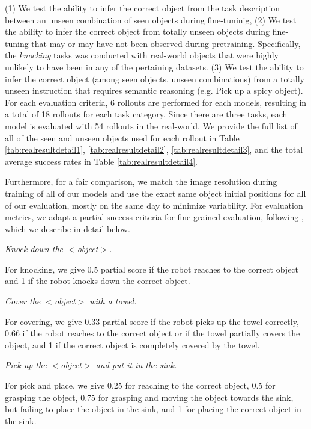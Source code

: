 \documentclass{article} %
\begin{document}
(1) We test the ability to infer the correct object from the task description between an unseen combination of seen objects during fine-tuninig, (2) We test the ability to infer the correct object from totally unseen objects during fine-tuning that may or may have not been observed during pretraining. Specifically, the \textit{knocking} tasks was conducted with real-world objects that were highly unlikely to have been in any of the pertaining datasets. (3) We test the ability to infer the correct object (among seen objects, unseen combinations) from a totally unseen instruction that requires semantic reasoning (e.g. Pick up a spicy object). For each evaluation criteria, 6 rollouts are performed for each models, resulting in a total of 18 rollouts for each task category. Since there are three tasks, each model is evaluated with 54 rollouts in the real-world. We provide the full list of all of the seen and unseen objects used for each rollout in Table \ref{tab:realresultdetail1}, \ref{tab:realresultdetail2}, \ref{tab:realresultdetail3}, and the total average success rates in Table \ref{tab:realresultdetail4}.

Furthermore, for a fair comparison, we match the image resolution during training of all of our models and use the exact same object initial positions for all of our evaluation, mostly on the same day to minimize variability. For evaluation metrics, we adapt a partial success criteria for fine-grained evaluation, following \citet{kim2024OpenVLA}, which we describe in detail below.

\textit{Knock down the $<$object$>$.} 

For knocking, we give 0.5 partial score if the robot reaches to the correct object and 1 if the robot knocks down the correct object.

\textit{Cover the $<$object$>$ with a towel.} 

For covering, we give 0.33 partial score if the robot picks up the towel correctly, 0.66 if the robot reaches to the correct object or if the towel partially covers the object, and 1 if the correct object is completely covered by the towel.

\textit{Pick up the $<$object$>$ and put it in the sink.} 

For pick and place, we give 0.25 for reaching to the correct object, 0.5 for grasping the object, 0.75 for grasping and moving the object towards the sink, but failing to place the object in the sink, and 1 for placing the correct object in the sink.
\end{document}
